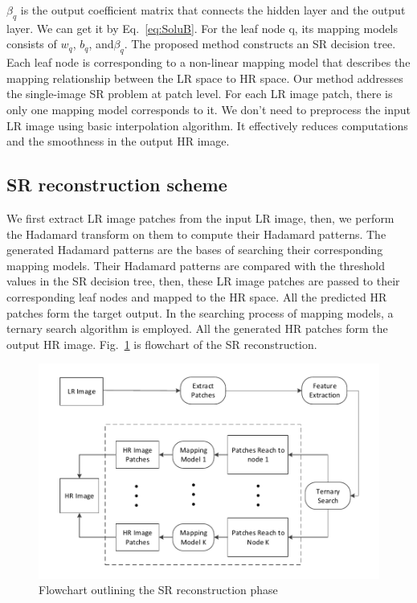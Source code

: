 \documentclass[review,numbers,sort&compress]{elsarticle}  %
\begin{document}
$\beta_q$ is the output coefficient matrix that connects the hidden layer and the output layer. We can get it by Eq.~\ref{eq:SoluB}. For the leaf node q, its mapping models consists of $w_q$, $b_q$, and$\beta_q$.
The proposed method constructs an SR decision tree. Each leaf node is corresponding to a non-linear mapping model that describes the mapping relationship between the LR space to HR space. Our method addresses the single-image SR problem at patch level. For each LR image patch, there is only one mapping model corresponds to it. We don’t need to preprocess the input LR image using basic interpolation algorithm. It effectively reduces computations and the smoothness in the output HR image.

\subsection{SR reconstruction scheme}
We first extract LR image patches from the input LR image, then, we perform the Hadamard transform on them to compute their Hadamard patterns. The generated Hadamard patterns are the bases of searching their corresponding mapping models. Their Hadamard patterns are compared with the threshold values in the SR decision tree, then, these LR image patches are passed to their corresponding leaf nodes and mapped to the HR space. All the predicted HR patches form the target output. In the searching process of mapping models, a ternary search algorithm is employed. All the generated HR patches form the output HR image. Fig.~\ref{fig:FlowForRecon} is flowchart of the SR reconstruction.
\begin{figure}[htbp]
  \centering
  \includegraphics[width=0.8\linewidth]{graphs/FlowForRecon_e.pdf}
  \caption{Flowchart outlining the SR reconstruction phase}\label{fig:FlowForRecon}
\end{figure}
\end{document}
